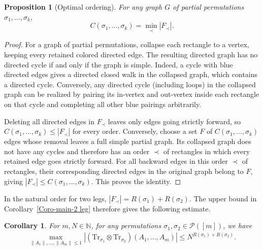 \documentclass[10pt,a4paper]{amsart}
\numberwithin{equation}{section}
\theoremstyle{plain}
\newtheorem{corollary}[theorem]{Corollary}
\newtheorem{proposition}[theorem]{Proposition}
\def\bN{\mathbb N}
\def\cP{\mathcal P}
\def\Tr{\mathrm {Tr}}
\begin{document}
\begin{proposition}[Optimal ordering]\label{Prop-cut-order}
For any graph $G$ of partial permutations $\sigma_1,\ldots,\sigma_k$,
\begin{equation}
C(\sigma_1,\ldots,\sigma_k)=\min_\prec |F_\prec|.
\end{equation}
\end{proposition}
\begin{proof}
For a graph of partial permutations, collapse each rectangle to a vertex, keeping every retained colored directed edge. The resulting directed graph has no directed cycle if and only if the graph is simple.
Indeed, a cycle with blue directed edges gives a directed closed walk in the collapsed graph, which contains a directed cycle. Conversely, any directed cycle (including loops) in the collapsed graph can be realized by pairing its in-vertex and out-vertex inside each rectangle on that cycle and completing all other blue pairings arbitrarily.

Deleting all directed edges in $F_\prec$ leaves only edges going strictly forward, so $C(\sigma_1,\ldots,\sigma_k)\le |F_\prec|$ for every order. Conversely, choose a set $F$ of $C(\sigma_1,\ldots,\sigma_k)$ edges whose removal leaves a full simple partial graph. Its collapsed graph does not have any cycles and therefore has an order $\prec$ of rectangles in which every retained edge goes strictly forward. For all backward edges in this order $\prec$ of rectangles, their corresponding directed edges in the original graph belong to $F$, giving $|F_\prec|\le C(\sigma_1,\ldots,\sigma_k)$. This proves the identity.
\end{proof}

In the natural order for two legs, $|F_\prec|=R(\sigma_1)+R(\sigma_2)$. The upper bound in Corollary~\ref{Coro-main-2 leg} therefore gives the following estimate.

\begin{corollary} \label{Coro-2 leg-backward}
For $m,N \in \bN$, for any permutations $\sigma_1,\sigma_2 \in \cP([m])$, we have
\begin{align*}
    \max_{\|A_1\|,\ldots,\|A_m\| \le 1} \left| \left( \Tr_{\sigma_1} \otimes \Tr_{\sigma_2} \right) \left( A_1, \ldots, A_m \right) \right|
    \le N^{R(\sigma_1) + R(\sigma_2)}.
\end{align*}
\end{corollary}
\end{document}

